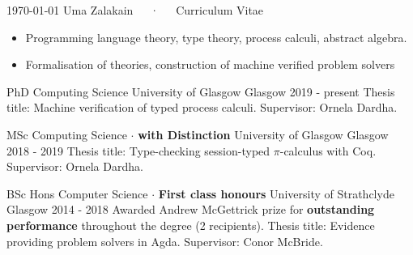 \documentclass[11pt, a4paper]{awesome-cv}
\begin{document}
\makecvheader

\makecvfooter
  {\today}
  {Uma Zalakain~~~·~~~Curriculum Vitae}
  {\thepage}



\begin{itemize}[noitemsep,wide=0pt]
    \item {Programming language theory, type theory, process calculi, abstract algebra.}
    \item {Formalisation of theories, construction of machine verified problem solvers}
\end{itemize}


\begin{cventries}
    \cventry
      {PhD Computing Science} %
      {University of Glasgow} %
      {Glasgow} %
      {2019 - present} %
      {
          Thesis title: Machine verification of typed process calculi.\newline
          Supervisor: Ornela Dardha.\newline
      }

    \cventry
      {MSc Computing Science $\cdot$ \textbf{with Distinction}} %
      {University of Glasgow} %
      {Glasgow} %
      {2018 - 2019} %
      {
          Thesis title: Type-checking session-typed $\pi$-calculus with Coq.\newline
          Supervisor: Ornela Dardha.\newline
      }

    \cventry
      {BSc Hons Computer Science $\cdot$ \textbf{First class honours}} %
      {University of Strathclyde} %
      {Glasgow} %
      {2014 - 2018} %
      {
          Awarded Andrew McGettrick prize for \textbf{outstanding performance}
          throughout the degree (2 recipients).\newline
          Thesis title: Evidence providing problem solvers in Agda.\newline
          Supervisor: Conor McBride.\newline
      }
\end{cventries}
\end{document}
